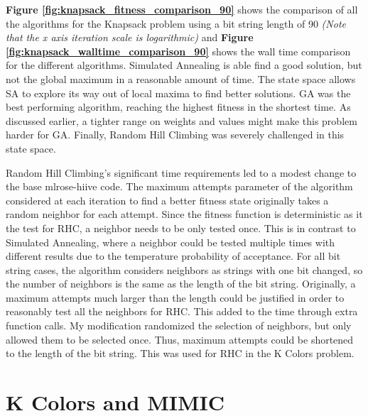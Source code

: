 \documentclass[letterpaper]{article} %
\begin{document}
\textbf{Figure \ref{fig:knapsack_fitness_comparison_90}} shows the comparison of all the algorithms for the Knapsack problem using a bit string length of 90 \emph{(Note that the x axis iteration scale is logarithmic)} and \textbf{Figure \ref{fig:knapsack_walltime_comparison_90}} shows the wall time comparison for the different algorithms.  Simulated Annealing is able find a good solution, but not the global maximum in a reasonable amount of time. The state space allows SA to explore its way out of local maxima to find better solutions.  GA was the best performing algorithm, reaching the highest fitness in the shortest time.  As discussed earlier, a tighter range on weights and values might make this problem harder for GA.  Finally, Random Hill Climbing was severely challenged in this state space.  

Random Hill Climbing's significant time requirements led to a modest change to the base mlrose-hiive code.  The maximum attempts parameter of the algorithm considered at each iteration to find a better fitness state originally takes a random neighbor for each attempt.  Since the fitness function is deterministic as it the test for RHC, a neighbor needs to be only tested once.  This is in contrast to Simulated Annealing, where a neighbor could be tested multiple times with different results due to the temperature probability of acceptance.  For all bit string cases, the algorithm considers neighbors as strings with one bit changed, so the number of neighbors is the same as the length of the bit string.  Originally, a maximum attempts much larger than the length could be justified in order to reasonably test all the neighbors for RHC.  This added to the time through extra function calls.  My modification randomized the selection of neighbors, but only allowed them to be selected once.  Thus, maximum attempts could be shortened to the length of the bit string.  This was used for RHC in the K Colors problem. 



\section{K Colors and MIMIC}
\end{document}
